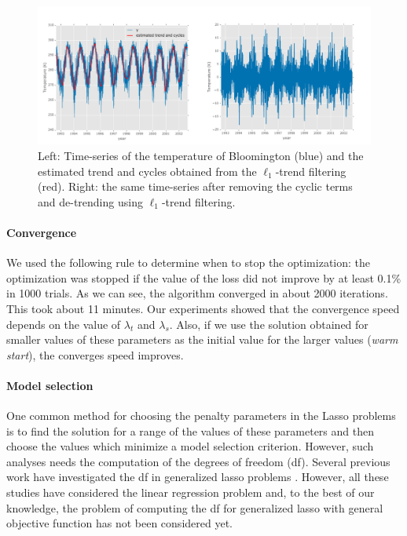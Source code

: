 \documentclass{article}
\begin{document}
\begin{figure}[tb]
  \centering
  \includegraphics[width=\columnwidth]{Figures/bloom_trend_resid}
  \caption{Left: Time-series of the temperature of Bloomington (blue)
    and the estimated trend and cycles obtained from the
    $\ell_1$-trend filtering (red). Right: the same time-series after
    removing the cyclic terms and de-trending using $\ell_1$-trend
    filtering.} 
  \label{fig:bloom_detrended}
\end{figure} 


\paragraph{Convergence}

We used the following rule to determine when to stop the optimization:
the optimization was stopped if the value of the loss did not improve
by at least 0.1\% in 1000 trials. As we can see, the algorithm
converged in about 2000 iterations. This took about 11 minutes. Our
experiments showed that the convergence speed depends on the value of
$\lambda_t$ and $\lambda_s$. Also, if we use the solution obtained for
smaller values of these parameters as the initial value for the larger
values (\textit{warm start}), the converges speed improves. 


\paragraph{Model selection}
One common method for choosing the penalty parameters in the Lasso
problems is to find the solution for a range of the values of these
parameters and then choose the values which minimize a model selection
criterion. However, such analyses needs the computation of the degrees
of freedom (df). Several previous work have investigated the df in
generalized lasso problems
\citep{tibshirani_degrees_2012,hu_dual_2015,zeng_geometry_2017}. However,
all these studies have considered the linear regression problem and,
to the best of our knowledge, the problem of computing the df for
generalized lasso with general objective function has not been
considered yet. 
\end{document}
